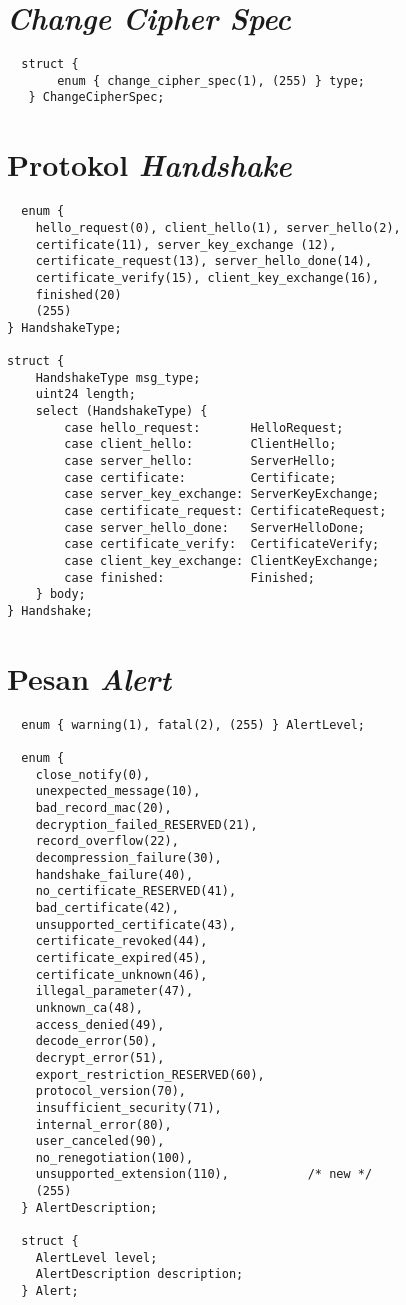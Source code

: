\section{\emph{Change Cipher Spec}}

\begin{verbatim}
  struct {
       enum { change_cipher_spec(1), (255) } type;
   } ChangeCipherSpec;
\end{verbatim}

\section{Protokol \emph{Handshake}}

\begin{verbatim}
  enum {
    hello_request(0), client_hello(1), server_hello(2),
    certificate(11), server_key_exchange (12),
    certificate_request(13), server_hello_done(14),
    certificate_verify(15), client_key_exchange(16),
    finished(20)
    (255)
} HandshakeType;

struct {
    HandshakeType msg_type;
    uint24 length;
    select (HandshakeType) {
        case hello_request:       HelloRequest;
        case client_hello:        ClientHello;
        case server_hello:        ServerHello;
        case certificate:         Certificate;
        case server_key_exchange: ServerKeyExchange;
        case certificate_request: CertificateRequest;
        case server_hello_done:   ServerHelloDone;
        case certificate_verify:  CertificateVerify;
        case client_key_exchange: ClientKeyExchange;
        case finished:            Finished;
    } body;
} Handshake;

\end{verbatim}

\section{Pesan \emph{Alert}}

\begin{verbatim}
  enum { warning(1), fatal(2), (255) } AlertLevel;

  enum {
    close_notify(0),
    unexpected_message(10),
    bad_record_mac(20),
    decryption_failed_RESERVED(21),
    record_overflow(22),
    decompression_failure(30),
    handshake_failure(40),
    no_certificate_RESERVED(41),
    bad_certificate(42),
    unsupported_certificate(43),
    certificate_revoked(44),
    certificate_expired(45),
    certificate_unknown(46),
    illegal_parameter(47),
    unknown_ca(48),
    access_denied(49),
    decode_error(50),
    decrypt_error(51),
    export_restriction_RESERVED(60),
    protocol_version(70),
    insufficient_security(71),
    internal_error(80),
    user_canceled(90),
    no_renegotiation(100),
    unsupported_extension(110),           /* new */
    (255)
  } AlertDescription;

  struct {
    AlertLevel level;
    AlertDescription description;
  } Alert;
\end{verbatim}

